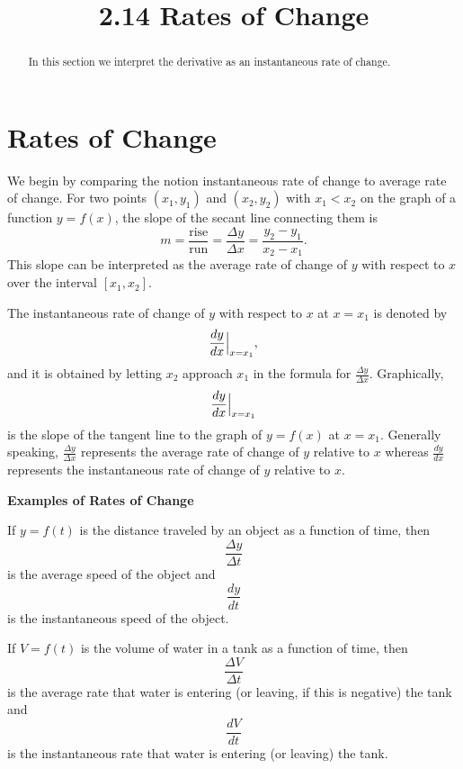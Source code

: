 \documentclass{ximera}
\title{2.14 Rates of Change}
\begin{document}
\begin{abstract}
In this section we interpret the derivative as an instantaneous rate of change.
\end{abstract}

\maketitle

\section{Rates of Change}

We begin by comparing the notion instantaneous rate of change to average rate of change. 
For two points $(x_1, y_1)$ and $(x_2, y_2)$ with $x_1 < x_2$ on the graph of a function
$y = f(x)$, the slope of the secant line connecting them is 
\[m = \frac{\text{rise}}{\text{run}} = \frac{\Delta y}{\Delta x} = \frac{y_2 - y_1}{x_2 - x_1}.\]
This slope can be interpreted as the average rate of change of $y$ with respect to $x$ over the interval $[x_1, x_2]$.

The instantaneous rate of change of $y$ with respect to $x$ at $x = x_1$ is denoted by
\[\frac{dy}{dx}\Big{|}_{x=x_1},\]
and it is obtained by letting $x_2$ approach $x_1$ in the formula for $\frac{\Delta y}{\Delta x}.$
Graphically, 
\[\frac{dy}{dx}\Big{|}_{x=x_1}\]
is the slope of the tangent line to the graph of $y = f(x)$ at $x=x_1$.
Generally speaking, $\frac{\Delta y}{\Delta x}$
represents the average rate of change of $y$ relative to $x$ whereas
$\frac{dy}{dx}$
represents the instantaneous rate of change of $y$ relative to $x$.


\begin{center}
\bf{Examples of Rates of Change}
\end{center}
 
\begin{example}

If $y = f(t)$ is the distance traveled by an object as a function of time, then 
\[\frac{\Delta y}{\Delta t}\]
is the average speed of the object and
\[\frac{dy}{dt}\]
is the instantaneous speed of the object.
\end{example}

\begin{example} If $V = f(t)$ is the volume of water in a tank as a function of time, then 
\[\frac{\Delta V}{\Delta t}\]
is the average rate that water is entering (or leaving, if this is negative) the tank and
\[\frac{dV}{dt}\]
is the instantaneous rate that water is entering (or leaving) the tank.
 \end{example}
\end{document}
